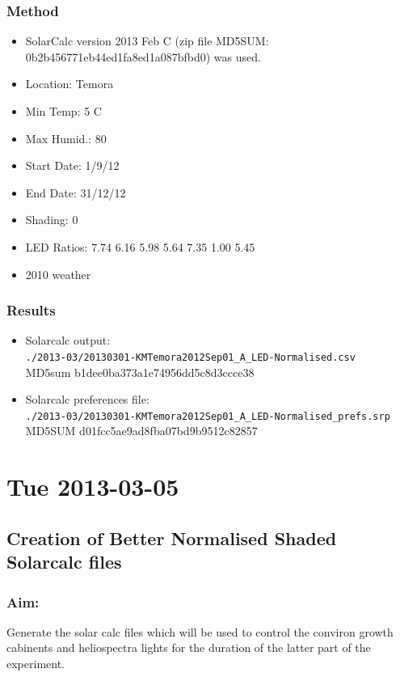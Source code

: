 \documentclass[12pt,a4paper]{book}
\begin{document}
    \subsection*{Method}
      \begin{itemize} \itemsep1pt \parskip0pt 
        \item SolarCalc version 2013 Feb C (zip file MD5SUM: 0b2b456771eb44ed1fa8ed1a087bfbd0) was
          used.
        \item Location: Temora
        \item Min Temp: 5 C
        \item Max Humid.: 80
        \item Start Date: 1/9/12
        \item End Date: 31/12/12
        \item Shading: 0
        \item LED Ratios: 7.74 6.16 5.98 5.64 7.35 1.00 5.45
        \item 2010 weather
      \end{itemize}
    \subsection*{Results}
      \begin{itemize} \itemsep1pt \parskip0pt 
        \item Solarcalc output:\\
          \verb+./2013-03/20130301-KMTemora2012Sep01_A_LED-Normalised.csv+ \\
          MD5sum b1dee0ba373a1e74956dd5c8d3ccce38
        \item Solarcalc preferences file:\\
          \verb+./2013-03/20130301-KMTemora2012Sep01_A_LED-Normalised_prefs.srp+ \\
          MD5SUM d01fcc5ae9ad8fba07bd9b9512c82857
      \end{itemize}

\chapter*{Tue 2013-03-05}
  \section*{Creation of Better Normalised Shaded Solarcalc files}
    \subsection*{Aim:}
      Generate the solar calc files which will be used to control the conviron growth cabinents and
      heliospectra lights for the duration of the latter part of the experiment.
\end{document}
